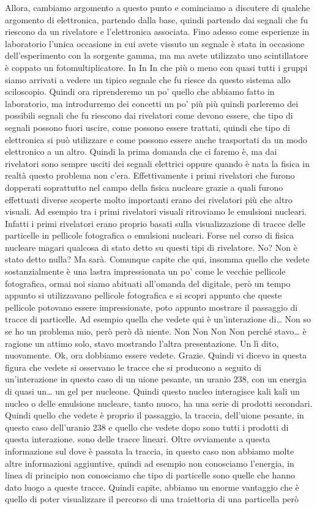 Allora, cambiamo argomento a questo punto e cominciamo a discutere di qualche argomento di elettronica, partendo dalla base, quindi partendo dai segnali che fu riescono da un rivelatore e l'elettronica associata. Fino adesso come esperienze in laboratorio l'unica occasione in cui avete vissuto un segnale è stata in occasione dell'esperimento con la sorgente gamma, ma ma avete utilizzato uno scintillatore è coppato un fotomultiplicatore. In In In che più o meno con quasi tutti i gruppi siamo arrivati a vedere un tipico segnale che fu riesce da questo sistema allo sciloscopio. Quindi ora riprenderemo un po' quello che abbiamo fatto in laboratorio, ma introdurremo dei concetti un po' più più quindi parleremo dei possibili segnali che fu riescono dai rivelatori come devono essere, che tipo di segnali possono fuori uscire, come possono essere trattati, quindi che tipo di elettronica si può utilizzare e come possono essere anche trasportati da un modo elettronico a un altro. Quindi la prima domanda che ci faremo è, ma dai rivelatori sono sempre usciti dei segnali elettrici oppure quando è nata la fisica in realtà questo problema non c'era. Effettivamente i primi rivelatori che furono dopperati soprattutto nel campo della fisica nucleare grazie a quali furono effettuati diverse scoperte molto importanti erano dei rivelatori più che altro visuali. Ad esempio tra i primi rivelatori visuali ritroviamo le emulsioni nucleari. Infatti i primi rivelatori erano proprio basati sulla visualizzazione di tracce delle particelle in pellicole fotografica o emulsioni nucleari. Forse nel corso di fisica nucleare magari qualcosa di stato detto su questi tipi di rivelatore. No? Non è stato detto nulla? Ma sarà. Comunque capite che qui, insomma quello che vedete sostanzialmente è una lastra impressionata un po' come le vecchie pellicole fotografica, ormai noi siamo abituati all'omanda del digitale, però un tempo appunto si utilizzavano pellicole fotografica e si scopri appunto che queste pellicole potovano essere impressionate, poto appunto mostrare il passaggio di tracce di particelle. Ad esempio quella che vedete qui è un'interazione di… Non so se ho un problema mio, però però dà niente. Non Non Non Non perché stavo… è ragione un attimo solo, stavo mostrando l'altra presentazione. Un lì dito, nuovamente. Ok, ora dobbiamo essere vedete. Grazie. Quindi vi dicevo in questa figura che vedete si osservano le tracce che si producono a seguito di un'interazione in questo caso di un uione pesante, un uranio 238, con un energia di quasi un… un gel per nucleone. Quindi questo nucleo interagisce kali kali un nucleo o delle emulsione nucleare, tanto nuoco, ha una serie di prodotti secondari. Quindi quello che vedete è proprio il passaggio, la traccia, dell'uione pesante, in questo caso dell'uranio 238 e quello che vedete dopo sono tutti i prodotti di questa interazione. sono delle tracce lineari. Oltre ovviamente a questa informazione sul dove è passata la traccia, in questo caso non abbiamo molte altre informazioni aggiuntive, quindi ad esempio non conosciamo l'energia, in linea di principio non conosciamo che tipo di particelle sono quelle che hanno dato luogo a queste tracce. Quindi capite, abbiamo un enorme vantaggio che è quello di poter visualizzare il percorso di una traiettoria di una particella però 